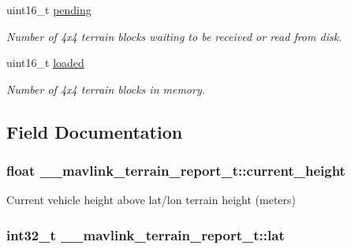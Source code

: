 \begin{DoxyCompactItemize}
uint16\+\_\+t \hyperlink{struct____mavlink__terrain__report__t_adabec5889b0cb6f5d18b8cf23195ec13}{pending}
\begin{DoxyCompactList}\small\item\em Number of 4x4 terrain blocks waiting to be received or read from disk. \end{DoxyCompactList}\item 
uint16\+\_\+t \hyperlink{struct____mavlink__terrain__report__t_abc023a29a8389a81af22bfa8c9099c71}{loaded}
\begin{DoxyCompactList}\small\item\em Number of 4x4 terrain blocks in memory. \end{DoxyCompactList}\end{DoxyCompactItemize}


\subsection{Field Documentation}
\hypertarget{struct____mavlink__terrain__report__t_a7f980f83f7e57ef6571ccdd84c205056}{
\subsubsection[{current\+\_\+height}]{\setlength{\rightskip}{0pt plus 5cm}float \+\_\+\+\_\+mavlink\+\_\+terrain\+\_\+report\+\_\+t\+::current\+\_\+height}}\label{struct____mavlink__terrain__report__t_a7f980f83f7e57ef6571ccdd84c205056}


Current vehicle height above lat/lon terrain height (meters) 

\hypertarget{struct____mavlink__terrain__report__t_a06d28829a705a21947a4b7d69e957ee0}{
\subsubsection[{lat}]{\setlength{\rightskip}{0pt plus 5cm}int32\+\_\+t \+\_\+\+\_\+mavlink\+\_\+terrain\+\_\+report\+\_\+t\+::lat}}\label{struct____mavlink__terrain__report__t_a06d28829a705a21947a4b7d69e957ee0}


